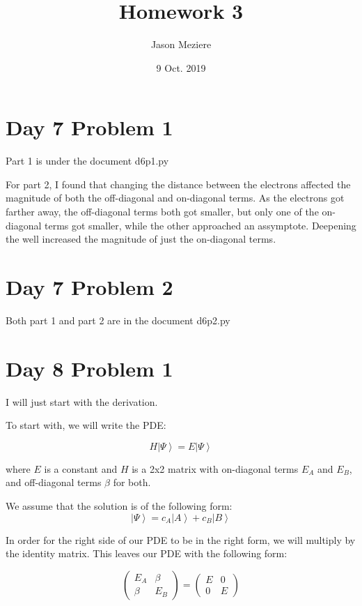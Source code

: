 \documentclass{article}
\begin{document}
\title{Homework 3}
\author{Jason Meziere}
\date{9 Oct. 2019}

\maketitle

\section{Day 7 Problem 1}

Part 1 is under the document d6p1.py

For part 2, I found that changing the distance between the electrons affected the magnitude of both the off-diagonal and on-diagonal terms. As the electrons got farther away, the off-diagonal terms both got smaller, but only one of the on-diagonal terms got smaller, while the other approached an assymptote. Deepening the well increased the magnitude of just the on-diagonal terms.

\section{Day 7 Problem 2}

Both part 1 and part 2 are in the document d6p2.py

\section{Day 8 Problem 1}

I will just start with the derivation.

To start with, we will write the PDE:

\begin{equation}
H \left| \Psi \right> = E \left| \Psi \right>
\end{equation}

where $E$ is a constant and $H$ is a 2x2 matrix with on-diagonal terms $E_A$ and $E_B$, and off-diagonal terms $\beta$ for both.

We assume that the solution is of the following form:
\begin{equation}
\left| \Psi \right>  = c_A \left| A \right> + c_B \left| B \right>
\end{equation}

In order for the right side of our PDE to be in the right form, we will multiply by the identity matrix. 
This leaves our PDE with the following form:

\begin{equation}
\begin{pmatrix} E_A & \beta \\ \beta & E_B \end{pmatrix} =
\begin{pmatrix} E & 0 \\ 0 & E \end{pmatrix}
\end{equation}
\end{document}
